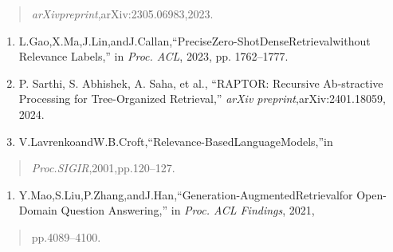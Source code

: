 \documentclass[
]{article}
\begin{document}
\begin{quote}
\protect{}\label{_bookmark45}{}\emph{arXivpreprint},arXiv:2305.06983,2023.
\end{quote}

\begin{enumerate}
\def\labelenumi{\arabic{enumi}.}
\setcounter{enumi}{36}
\item
  L.Gao,X.Ma,J.Lin,andJ.Callan,``PreciseZero-ShotDenseRetrieval\protect{}\label{_bookmark46}{}without Relevance Labels,'' in \emph{Proc. ACL}, 2023, pp. 1762--1777.
\item
  P. Sarthi, S. Abhishek, A. Saha, et al., ``RAPTOR: Recursive Ab-stractive Processing for Tree-Organized Retrieval,'' \emph{arXiv preprint},\protect{}\label{_bookmark47}{}arXiv:2401.18059, 2024.
\item
  V.LavrenkoandW.B.Croft,``Relevance-BasedLanguageModels,''in
\end{enumerate}

\begin{quote}
\protect{}\label{_bookmark48}{}\emph{Proc.SIGIR},2001,pp.120--127.
\end{quote}

\begin{enumerate}
\def\labelenumi{\arabic{enumi}.}
\setcounter{enumi}{39}
\item
  Y.Mao,S.Liu,P.Zhang,andJ.Han,``Generation-AugmentedRetrievalfor Open-Domain Question Answering,'' in \emph{Proc. ACL Findings}, 2021,
\end{enumerate}

\begin{quote}
\protect{}\label{_bookmark49}{}pp.4089--4100.
\end{quote}
\end{document}
